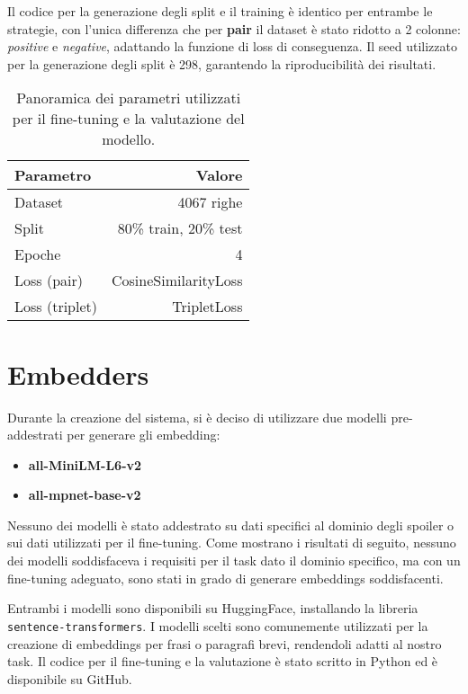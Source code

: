Il codice per la generazione degli split e il training è
identico per entrambe le strategie, con l'unica differenza
che per \textbf{pair} il dataset è stato ridotto a 2
colonne: \textit{positive} e \textit{negative}, adattando
la funzione di loss di conseguenza.
Il seed utilizzato per la generazione degli split è
298\cite{nisemonogatari_ep1}, garantendo la riproducibilità
dei risultati.

\begin{table}[H]
  \centering
  \begin{tabularx}{\textwidth}{l @{\extracolsep{\fill}} r}
    \toprule
    \textbf{Parametro} & \textbf{Valore}       \\
    \midrule
    Dataset            & 4067 righe            \\
    Split              & 80\% train, 20\% test \\
    Epoche             & 4                     \\
    Loss (pair)        & CosineSimilarityLoss  \\
    Loss (triplet)     & TripletLoss           \\
    \bottomrule
  \end{tabularx}
  \caption{Panoramica dei parametri utilizzati per il fine-tuning e la valutazione del modello.}
  \label{tab:dataset_eval}
\end{table}

\section{Embedders}
\label{sec:embedders_eval}
Durante la creazione del sistema, si è deciso di
utilizzare due modelli pre-addestrati per generare gli embedding:

\begin{itemize}
  \item \textbf{all-MiniLM-L6-v2}
  \item \textbf{all-mpnet-base-v2}
\end{itemize}

Nessuno dei modelli è stato addestrato su dati specifici al
dominio degli spoiler o sui dati utilizzati per il
fine-tuning.
Come mostrano i risultati di seguito, nessuno dei modelli
soddisfaceva i requisiti per il task dato il dominio
specifico, ma con un fine-tuning adeguato, sono stati in
grado di generare embeddings soddisfacenti.

Entrambi i modelli sono disponibili su HuggingFace,
installando la libreria \texttt{sentence-transformers}.
I modelli scelti sono comunemente utilizzati per la
creazione di embeddings per frasi o paragrafi brevi,
rendendoli adatti al nostro task.
Il codice per il fine-tuning e la valutazione è stato
scritto in Python ed è disponibile su GitHub.

